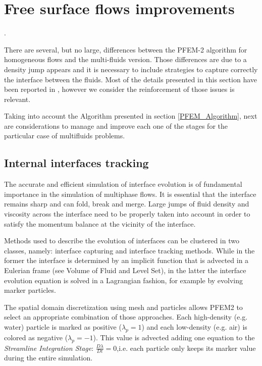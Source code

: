 \documentclass[a4paper,conference]{IEEEtran}
\begin{document}
\section{Free surface flows improvements}.

There are several, but no large, differences between the PFEM-2 algorithm for homogeneous flows and the multi-fluids version. Those differences are due to a density jump appears and it is necessary to include strategies to capture correctly the interface between the fluids. Most of the details presented in this section have been reported in \cite{Idelsohn13c}, however we consider the reinforcement of those issues is relevant.

Taking into account the Algorithm presented in section \ref{PFEM_Algorithm}, next are considerations to manage and improve each one of the stages for the particular case of multifluids problems. 

\subsection{Internal interfaces tracking}

The accurate and efficient simulation of interface evolution is of fundamental importance in the simulation of multiphase flows. It is essential that the interface remains sharp and can fold, break and merge. Large jumps of fluid density and viscosity across the interface need to be properly taken into account in order to satisfy the momentum balance at the vicinity of the interface. 

Methods used to describe the evolution of interfaces can be clustered in two classes, namely: interface capturing and interface tracking methods. While in the former the interface is determined by an implicit function that is advected in a Eulerian frame (see Volume of Fluid \cite{VoF} and Level Set\cite{Osher01}), in the latter the interface evolution equation is solved in a Lagrangian fashion, for example by evolving marker particles.

The spatial domain discretization using mesh and particles allows PFEM2 to select an appropriate combination of those approaches. Each high-density (e.g. water) particle is marked as positive ($\lambda_p=1$) and each low-density (e.g. air) is colored as negative ($\lambda_p=-1$). This value is advected adding one equation to the \textit{Streamline Integration Stage}: $\frac{D\lambda}{Dt}=0$,i.e. each particle only keeps its marker value during the entire simulation. 
\end{document}
